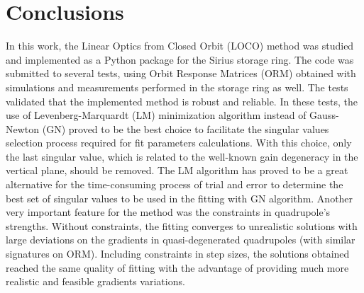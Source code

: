 \chapter*[Conclusions]{Conclusions}

    In this work, the Linear Optics from Closed Orbit (LOCO) method was studied and implemented as a Python package for the Sirius storage ring. The code was submitted to several tests, using Orbit Response Matrices (ORM) obtained with simulations and measurements performed in the storage ring as well. The tests validated that the implemented method is robust and reliable. In these tests, the use of Levenberg-Marquardt (LM) minimization algorithm instead of Gauss-Newton (GN) proved to be the best choice to facilitate the singular values selection process required for fit parameters calculations. With this choice, only the last singular value, which is related to the well-known gain degeneracy in the vertical plane, should be removed. The LM algorithm has proved to be a great alternative for the time-consuming process of trial and error to determine the best set of singular values to be used in the fitting with GN algorithm. Another very important feature for the method was the constraints in quadrupole's strengths. Without constraints, the fitting converges to unrealistic solutions with large deviations on the gradients in quasi-degenerated quadrupoles (with similar signatures on ORM). Including constraints in step sizes, the solutions obtained reached the same quality of fitting with the advantage of providing much more realistic and feasible gradients variations.
    
